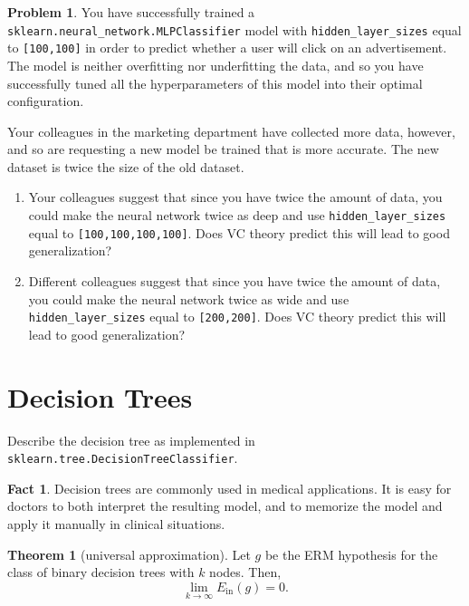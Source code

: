 \documentclass[10pt]{exam}
\theoremstyle{definition}
\newtheorem{problem}{Problem}
\newtheorem{fact}{Fact}
\newtheorem{theorem}{Theorem}
\newcommand{\Ein}{E_{\text{in}}}
\begin{document}
\newpage
\begin{problem}
    You have successfully trained a \lstinline{sklearn.neural_network.MLPClassifier} model with \lstinline{hidden_layer_sizes} equal to \lstinline{[100,100]} in order to predict whether a user will click on an advertisement.
    The model is neither overfitting nor underfitting the data,
    and so you have successfully tuned all the hyperparameters of this model into their optimal configuration.

    Your colleagues in the marketing department have collected more data, however, and so are requesting a new model be trained that is more accurate.
    The new dataset is twice the size of the old dataset.

    \begin{enumerate}
        \item Your colleagues suggest that since you have twice the amount of data, you could make the neural network twice as deep and use \lstinline{hidden_layer_sizes} equal to \lstinline{[100,100,100,100]}.
            Does VC theory predict this will lead to good generalization?

            \vspace{4in}
        \item Different colleagues suggest that since you have twice the amount of data, you could make the neural network twice as wide and use \lstinline{hidden_layer_sizes} equal to \lstinline{[200,200]}.
            Does VC theory predict this will lead to good generalization?
    \end{enumerate}
\end{problem}

\newpage
\section*{Decision Trees}

Describe the decision tree as implemented in \lstinline{sklearn.tree.DecisionTreeClassifier}.

\newpage
\begin{fact}
    Decision trees are commonly used in medical applications.
    It is easy for doctors to both interpret the resulting model,
    and to memorize the model and apply it manually in clinical situations.
\end{fact}

\begin{theorem}[universal approximation]
    Let $g$ be the ERM hypothesis for the class of binary decision trees with $k$ nodes.
    Then,
    \begin{equation}
        \lim_{k\to\infty} \Ein(g) = 0
        .
    \end{equation}
\end{theorem}
\end{document}
